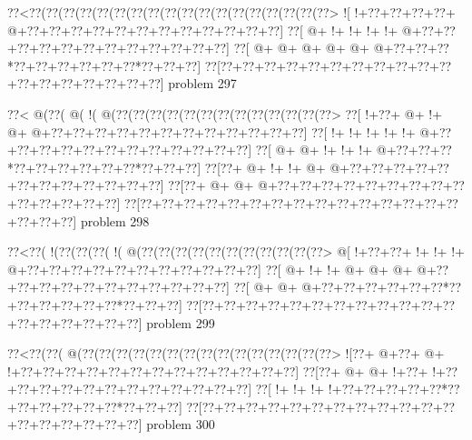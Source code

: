 \vbox{\vbox{\goo
\0??<\0??(\0??(\0??(\0??(\0??(\0??(\0??(\0??(\0??(\0??(\0??(\0??(\0??(\0??(\0??(\0??(\0??(\0??>
\- ![\- !+\0??+\0??+\0??+\0??+\- @+\0??+\0??+\0??+\0??+\0??+\0??+\0??+\0??+\0??+\0??+\0??+\0??]
\0??[\- @+\- !+\- !+\- !+\- !+\- @+\0??+\0??+\0??+\0??+\0??+\0??+\0??+\0??+\0??+\0??+\0??+\0??]
\0??[\- @+\- @+\- @+\- @+\- @+\- @+\0??+\0??+\0??*\0??+\0??+\0??+\0??+\0??+\0??*\0??+\0??+\0??]
\0??[\0??+\0??+\0??+\0??+\0??+\0??+\0??+\0??+\0??+\0??+\0??+\0??+\0??+\0??+\0??+\0??+\0??+\0??]
}
\hfil problem 297\hfil\break
}



\vbox{\vbox{\goo
\0??<\- @(\0??(\- @(\- !(\- @(\0??(\0??(\0??(\0??(\0??(\0??(\0??(\0??(\0??(\0??(\0??(\0??(\0??>
\0??[\- !+\0??+\- @+\- !+\- @+\- @+\0??+\0??+\0??+\0??+\0??+\0??+\0??+\0??+\0??+\0??+\0??+\0??]
\0??[\- !+\- !+\- !+\- !+\- !+\- @+\0??+\0??+\0??+\0??+\0??+\0??+\0??+\0??+\0??+\0??+\0??+\0??]
\0??[\- @+\- @+\- !+\- !+\- !+\- @+\0??+\0??+\0??*\0??+\0??+\0??+\0??+\0??+\0??*\0??+\0??+\0??]
\0??[\0??+\- @+\- !+\- !+\- @+\- @+\0??+\0??+\0??+\0??+\0??+\0??+\0??+\0??+\0??+\0??+\0??+\0??]
\0??[\0??+\- @+\- @+\- @+\0??+\0??+\0??+\0??+\0??+\0??+\0??+\0??+\0??+\0??+\0??+\0??+\0??+\0??]
\0??[\0??+\0??+\0??+\0??+\0??+\0??+\0??+\0??+\0??+\0??+\0??+\0??+\0??+\0??+\0??+\0??+\0??+\0??]
}
\hfil problem 298\hfil\break
}



\vbox{\vbox{\goo
\0??<\0??(\- !(\0??(\0??(\0??(\- !(\- @(\0??(\0??(\0??(\0??(\0??(\0??(\0??(\0??(\0??(\0??(\0??>
\- @[\- !+\0??+\0??+\- !+\- !+\- !+\- @+\0??+\0??+\0??+\0??+\0??+\0??+\0??+\0??+\0??+\0??+\0??]
\0??[\- @+\- !+\- !+\- @+\- @+\- @+\- @+\0??+\0??+\0??+\0??+\0??+\0??+\0??+\0??+\0??+\0??+\0??]
\0??[\- @+\- @+\- @+\0??+\0??+\0??+\0??+\0??+\0??*\0??+\0??+\0??+\0??+\0??+\0??*\0??+\0??+\0??]
\0??[\0??+\0??+\0??+\0??+\0??+\0??+\0??+\0??+\0??+\0??+\0??+\0??+\0??+\0??+\0??+\0??+\0??+\0??]
}
\hfil problem 299\hfil\break
}



\vbox{\vbox{\goo
\0??<\0??(\0??(\- @(\0??(\0??(\0??(\0??(\0??(\0??(\0??(\0??(\0??(\0??(\0??(\0??(\0??(\0??(\0??>
\- ![\0??+\- @+\0??+\- @+\- !+\0??+\0??+\0??+\0??+\0??+\0??+\0??+\0??+\0??+\0??+\0??+\0??+\0??]
\0??[\0??+\- @+\- @+\- !+\0??+\- !+\0??+\0??+\0??+\0??+\0??+\0??+\0??+\0??+\0??+\0??+\0??+\0??]
\0??[\- !+\- !+\- !+\- !+\0??+\0??+\0??+\0??+\0??*\0??+\0??+\0??+\0??+\0??+\0??*\0??+\0??+\0??]
\0??[\0??+\0??+\0??+\0??+\0??+\0??+\0??+\0??+\0??+\0??+\0??+\0??+\0??+\0??+\0??+\0??+\0??+\0??]
}
\hfil problem 300\hfil\break
}



